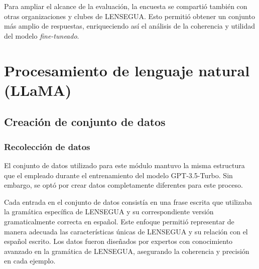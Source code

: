 Para ampliar el alcance de la evaluación, la encuesta se compartió también con otras organizaciones y clubes de LENSEGUA. Esto permitió obtener un conjunto más amplio de respuestas, enriqueciendo así el análisis de la coherencia y utilidad del modelo \textit{fine-tuneado}.













































\section{Procesamiento de lenguaje natural (LLaMA)} 


\subsection{Creación de conjunto de datos}

\subsubsection{Recolección de datos}

El conjunto de datos utilizado para este módulo mantuvo la misma estructura que el empleado durante el entrenamiento del modelo GPT-3.5-Turbo. Sin embargo, se optó por crear datos completamente diferentes para este proceso. 

Cada entrada en el conjunto de datos consistía en una frase escrita que utilizaba la gramática específica de LENSEGUA y su correspondiente versión gramaticalmente correcta en español. Este enfoque permitió representar de manera adecuada las características únicas de LENSEGUA y su relación con el español escrito. Los datos fueron diseñados por expertos con conocimiento avanzado en la gramática de LENSEGUA, asegurando la coherencia y precisión en cada ejemplo.

